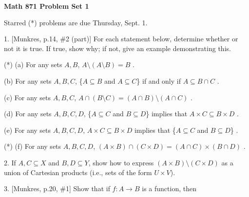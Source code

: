 


\def\ctln{\centerline}
\def\msk{\medskip}
\def\bsk{\bigskip}
\def\ssk{\smallskip}
\def\ra{\rightarrow}

\UseAMSsymbols

\ctln{\bf Math 871 Problem Set 1}

\msk

Starred (*) problems are due Thursday, Sept. 1.

\msk

\item{1.} [Munkres, p.14, \#2 (part)] For each statement below,
determine whether or not it is true. If true, show why; if 
not, give an example demonstrating this.

\ssk

\item{(*)} (a) For any sets $A,B$, $A \setminus (A\setminus B) = B$ .

\ssk

\item{} (b) For any sets $A,B,C$, \{$A\subseteq B$ and $A\subseteq C$\} 
if and only if $A\subseteq B\cap C$ .

\ssk

\item{} (c) For any sets $A,B,C$, $A\cap(B\setminus C) = (A\cap B)\setminus(A\cap C)$ .

\ssk

\item{} (d) For any sets $A,B,C,D$, \{$A\subseteq C$ and $B\subseteq D$\} implies that 
$A\times C \subseteq B\times D$ .

\ssk

\item{} (e) For any sets $A,B,C,D$, $A\times C \subseteq B\times D$ implies that 
\{$A\subseteq C$ and $B\subseteq D$\} .

\ssk

\item{(*)} (f) For any sets $A,B,C,D$, $(A\times B)\cap(C\times D) = (A\cap C)\times (B\cap D)$ .

\msk

\item{2.} If $A,C\subseteq X$ and $B,D\subseteq Y$, show how to express
$(A\times B)\setminus (C\times D)$ as a union of Cartesian products 
(i.e., sets of the form $U\times V$).

\msk

\item{3.} [Munkres, p.20, \#1] Show that if $f:A\ra B$ is a function, then

